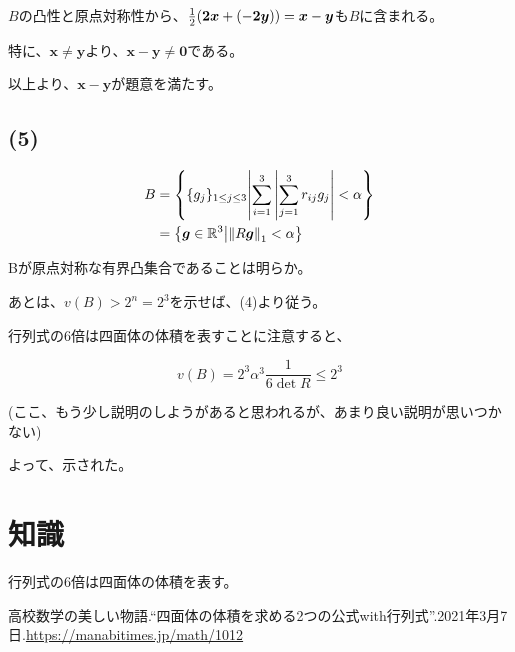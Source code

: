 \documentclass[a4paper, 10pt, dvipdfmx]{jlreq}
\begin{document}
$B$の凸性と原点対称性から、$\frac{1}{2}\qty(\bm{2x}+(-\bm{2y}))=\bm{x}-\bm{y}$も$B$に含まれる。

特に、$\bm{x} \neq \bm{y}$より、$\bm{x}-\bm{y} \neq \bm{0}$である。

以上より、$\bm{x}-\bm{y}$が題意を満たす。

\subsection*{(5)}

\begin{align*}
  B & =\left\{\{g_j\}_{1 \leq j\leq 3} \middle| \sum_{i=1}^{3} \left\lvert \sum_{j=1}^{3}r_{ij}g_j \right\rvert < \alpha \right\} \\
    & =\left\{\bm{g}\in \mathbb{R}^3 \middle| \norm{R\bm{g}}_1 < \alpha \right\}
\end{align*}

Bが原点対称な有界凸集合であることは明らか。

あとは、$v(B)>2^n=2^3$を示せば、(4)より従う。

行列式の6倍は四面体の体積を表すことに注意すると、

\begin{equation*}
  v(B)=2^3 \alpha^3 \frac{1}{6\det R} \leq 2^3
\end{equation*}

(ここ、もう少し説明のしようがあると思われるが、あまり良い説明が思いつかない)

よって、示された。

\section{知識}

行列式の6倍は四面体の体積を表す。\cite{site:1}

\begin{thebibliography}{9}
  高校数学の美しい物語.``四面体の体積を求める2つの公式with行列式''.2021年3月7日.\url{https://manabitimes.jp/math/1012}
\end{thebibliography}
\end{document}
